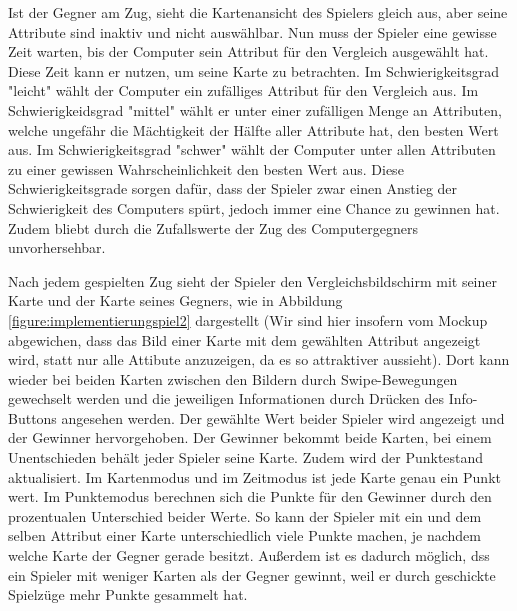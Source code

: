 Ist der Gegner am Zug, sieht die Kartenansicht des Spielers gleich aus, aber seine Attribute sind inaktiv und nicht auswählbar. Nun muss der Spieler eine gewisse Zeit warten, bis der Computer sein Attribut für den Vergleich ausgewählt hat. Diese Zeit kann er nutzen, um seine Karte zu betrachten. Im Schwierigkeitsgrad "leicht" wählt der Computer ein zufälliges Attribut für den Vergleich aus. Im Schwierigkeidsgrad "mittel" wählt er unter einer zufälligen Menge an Attributen, welche ungefähr die Mächtigkeit der Hälfte aller Attribute hat, den besten Wert aus. Im Schwierigkeitsgrad "schwer" wählt der Computer unter allen Attributen zu einer gewissen Wahrscheinlichkeit den besten Wert aus. Diese Schwierigkeitsgrade sorgen dafür, dass der Spieler zwar einen Anstieg der Schwierigkeit des Computers spürt, jedoch immer eine Chance zu gewinnen hat. Zudem bliebt durch die Zufallswerte der Zug des Computergegners unvorhersehbar.

Nach jedem gespielten Zug sieht der Spieler den Vergleichsbildschirm mit seiner Karte und der Karte seines Gegners, wie in Abbildung \ref{figure:implementierungspiel2}  dargestellt (Wir sind hier insofern vom Mockup abgewichen, dass das Bild einer Karte mit dem gewählten Attribut angezeigt wird, statt nur alle Attibute anzuzeigen, da es so attraktiver aussieht). Dort kann wieder bei beiden Karten zwischen den Bildern durch Swipe-Bewegungen gewechselt werden und die jeweiligen Informationen durch Drücken des Info-Buttons angesehen werden. Der gewählte Wert beider Spieler wird angezeigt und der Gewinner hervorgehoben. Der Gewinner bekommt beide Karten, bei einem Unentschieden behält jeder Spieler seine Karte. Zudem wird der Punktestand aktualisiert. Im Kartenmodus und im Zeitmodus ist jede Karte genau ein Punkt wert. Im Punktemodus berechnen sich die Punkte für den Gewinner durch den prozentualen Unterschied beider Werte. So kann der Spieler mit ein und dem selben Attribut einer Karte unterschiedlich viele Punkte machen, je nachdem welche Karte der Gegner gerade besitzt. Außerdem ist es dadurch möglich, dss ein Spieler mit weniger Karten als der Gegner gewinnt, weil er durch geschickte Spielzüge mehr Punkte gesammelt hat.\\

